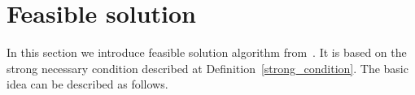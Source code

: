         










\section{Feasible solution} \label{section_feasible_solution}
In this section we introduce feasible solution algorithm from~\cite{hawkins:1994}.
It is based on the strong necessary condition described at Definition~\ref{strong_condition}. 
The basic idea can be described as follows.

